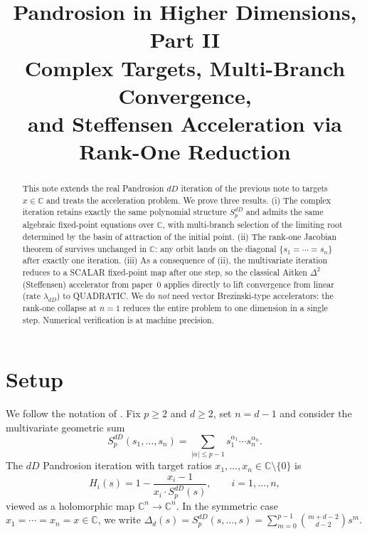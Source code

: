 \documentclass[11pt,a4paper]{article}
\title{\textbf{Pandrosion in Higher Dimensions, Part II}\\[0.3em]
\large Complex Targets, Multi-Branch Convergence,\\
and Steffensen Acceleration via Rank-One Reduction}
\author{}
\date{}
\theoremstyle{definition}
\theoremstyle{remark}
\newcommand{\C}{\mathbb{C}}
\begin{document}
\maketitle

\begin{abstract}
This note extends the real Pandrosion $dD$ iteration of the previous note
\cite{1pandrosion_dD} to targets $x \in \C$ and treats the acceleration
problem.  We prove three results.  (i) The complex iteration retains
exactly the same polynomial structure $S_p^{dD}$ and admits the same
algebraic fixed-point equations over $\C$, with multi-branch
selection of the limiting root determined by the basin of attraction of
the initial point.  (ii) The rank-one Jacobian theorem of
\cite{1pandrosion_dD} survives unchanged in $\C$: any orbit lands on the
diagonal $\{s_1 = \cdots = s_n\}$ after exactly one iteration.  (iii) As a
consequence of (ii), the multivariate iteration reduces to a SCALAR
fixed-point map after one step, so the classical Aitken $\Delta^2$
(Steffensen) accelerator from paper~0 \cite{0pandrosion_pth} applies
directly to lift convergence from linear (rate $\lambda_{dD}$) to
QUADRATIC.  We do \emph{not} need vector Brezinski-type accelerators:
the rank-one collapse at $n = 1$ reduces the entire problem to one
dimension in a single step.  Numerical verification is at machine
precision.
\end{abstract}

\section{Setup}

We follow the notation of \cite{1pandrosion_dD}.  Fix $p \geq 2$ and
$d \geq 2$, set $n = d - 1$ and consider the multivariate geometric sum
\begin{equation}
  S_p^{dD}(s_1, \ldots, s_n) = \sum_{|\alpha| \leq p-1} s_1^{\alpha_1} \cdots s_n^{\alpha_n}.
\end{equation}
The $dD$ Pandrosion iteration with target ratios $x_1, \ldots, x_n \in
\C \setminus \{0\}$ is
\begin{equation}
  \label{eq:H_dD_complex}
  H_i(s) = 1 - \frac{x_i - 1}{x_i \cdot S_p^{dD}(s)}, \qquad i = 1, \ldots, n,
\end{equation}
viewed as a holomorphic map $\C^n \to \C^n$.  In the symmetric case
$x_1 = \cdots = x_n = x \in \C$, we write $\Delta_d(s) = S_p^{dD}(s, \ldots, s) =
\sum_{m=0}^{p-1} \binom{m+d-2}{d-2} s^m$.
\end{document}
